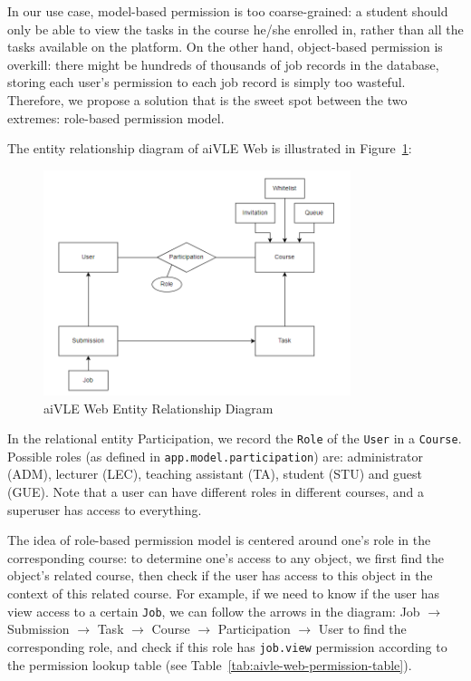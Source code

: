 In our use case, model-based permission is too coarse-grained: a student should only be able to view the tasks in the course he/she enrolled in, rather than all the tasks available on the platform. On the other hand, object-based permission is overkill: there might be hundreds of thousands of job records in the database, storing each user's permission to each job record is simply too wasteful. Therefore, we propose a solution that is the sweet spot between the two extremes: role-based permission model.

The entity relationship diagram of aiVLE Web is illustrated in Figure~\ref{fig:aivle-web-er-diagram}:
\begin{figure}[H]
    \centering
    \includegraphics[width=0.8\textwidth]{images/aivle-web-er-diagram.png}
    \caption{aiVLE Web Entity Relationship Diagram}
    \label{fig:aivle-web-er-diagram}
\end{figure}

In the relational entity Participation, we record the \texttt{Role} of the \texttt{User} in a \texttt{Course}. Possible roles (as defined in \texttt{app.model.participation}) are: administrator (ADM), lecturer (LEC), teaching assistant (TA), student (STU) and guest (GUE). Note that a user can have different roles in different courses, and a superuser has access to everything.

The idea of role-based permission model is centered around one's role in the corresponding course: to determine one's access to any object, we first find the object's related course, then check if the user has access to this object in the context of this related course. For example, if we need to know if the user has view access to a certain \texttt{Job}, we can follow the arrows in the diagram: Job $\to$ Submission $\to$ Task $\to$ Course $\to$ Participation $\to$ User to find the corresponding role, and check if this role has \texttt{job.view} permission according to the permission lookup table (see Table~\ref{tab:aivle-web-permission-table}).

